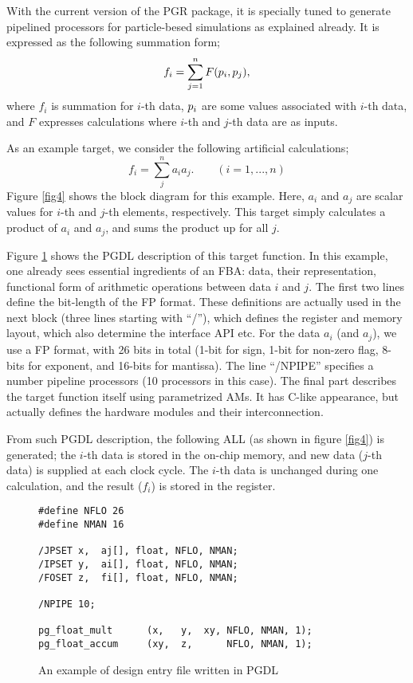 \documentclass{llncs}
\begin{document}
With the current version of the PGR package, 
it is specially tuned to generate pipelined processors
for particle-besed simulations as explained already.
It is expressed as the following summation form;
\begin{equation}
f_i = \sum_{j = 1}^{n} F(\boldmath{p}_i, \boldmath{p}_j),
\end{equation}
where $f_i$ is summation for $i$-th data, $\boldmath{p}_i$ are
some values associated with $i$-th data, and
$F$ expresses calculations where $i$-th and $j$-th data are as inputs.

As an example target, we consider the following artificial calculations;
\begin{equation}
f_i = \sum_j^n {a_i a_j}.\qquad (i=1,...,n)
\end{equation}
Figure \ref{fig4} shows the block diagram for this example.
Here, $a_i$ and $a_j$ are scalar values for $i$-th and
$j$-th elements, respectively.
This target simply calculates a product of $a_i$ and $a_j$, 
and sums the product up for all $j$.

Figure \ref{fig5} shows the PGDL description of this target function.
In this example, one already sees essential ingredients of an FBA:
data, their representation, functional form of arithmetic operations
between data $i$ and $j$.
The first two lines define the bit-length of the FP format.
These definitions are actually used in the next block
(three lines starting with ``/''),
which defines the register and memory layout,
which also determine the interface API etc. 
For the data $a_i$ (and $a_j$), we use a FP format,
with 26 bits in total (1-bit for sign, 1-bit for non-zero flag, 8-bits
for exponent, and 16-bits for mantissa).
The line ``/NPIPE'' specifies a number pipeline processors (10 processors in this case).
The final part describes the target function itself using
parametrized AMs. It has C-like appearance, but
actually defines the hardware modules and their interconnection.

From such PGDL description, the following ALL (as shown in figure \ref{fig4})
is generated; the $i$-th data is stored in the on-chip memory,
and new data ($j$-th data) is supplied at each clock cycle.
The $i$-th data is unchanged during one calculation, and 
the result ($f_i$) is stored in the register.

\begin{figure}
\scriptsize
\begin{verbatim}
#define NFLO 26
#define NMAN 16

/JPSET x,  aj[], float, NFLO, NMAN;
/IPSET y,  ai[], float, NFLO, NMAN;
/FOSET z,  fi[], float, NFLO, NMAN;

/NPIPE 10;

pg_float_mult      (x,   y,  xy, NFLO, NMAN, 1);
pg_float_accum     (xy,  z,      NFLO, NMAN, 1);
\end{verbatim}
\caption{An example of design entry file written in PGDL}
\label{fig5}
\end{figure}
\end{document}
